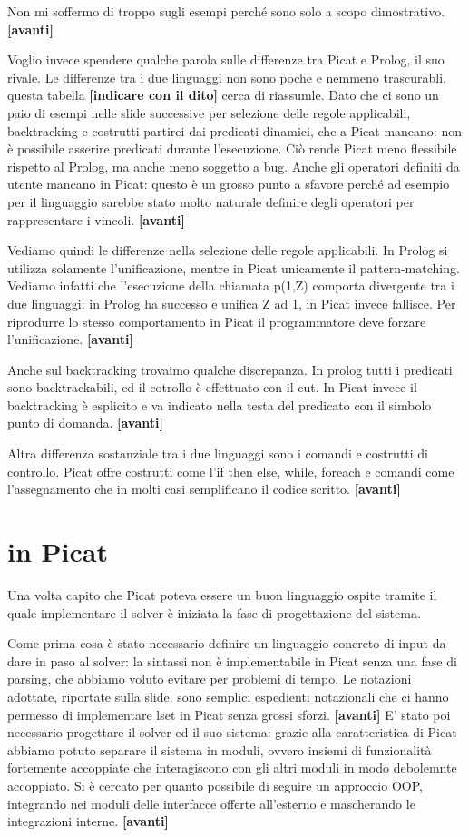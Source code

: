 \documentclass[11pt]{article}
\newcommand*{\nextslide}{\textbf{[avanti]}}
\newcommand*{\fingerpointer}{\textbf{[indicare con il dito]}}
\begin{document}
Non mi soffermo di troppo sugli esempi perché sono solo a scopo
dimostrativo. \nextslide{}

\medskip

Voglio invece spendere qualche parola sulle differenze tra Picat e
Prolog, il suo rivale. Le differenze tra i due linguaggi non sono
poche e nemmeno trascurabli. questa tabella \fingerpointer{} cerca di
riassumle. Dato che ci sono un paio di esempi nelle slide successive
per selezione delle regole applicabili, backtracking e costrutti
partirei dai predicati dinamici, che a Picat mancano: non è possibile
asserire predicati durante l'esecuzione. Ciò rende Picat meno
flessibile rispetto al Prolog, ma anche meno soggetto a bug. Anche gli
operatori definiti da utente mancano in Picat: questo è un grosso
punto a sfavore perché ad esempio per il linguaggio \lset{} sarebbe
stato molto naturale definire degli operatori per rappresentare i
vincoli. \nextslide{}

Vediamo quindi le differenze nella selezione delle regole applicabili.
In Prolog si utilizza solamente l'unificazione, mentre in Picat
unicamente il pattern-matching. Vediamo infatti che l'esecuzione della
chiamata p(1,Z) comporta divergente tra i due linguaggi: in Prolog ha
successo e unifica Z ad 1, in Picat invece fallisce. Per riprodurre lo
stesso comportamento in Picat il programmatore deve forzare
l'unificazione.  \nextslide{}

Anche sul backtracking trovaimo qualche discrepanza. In prolog tutti i
predicati sono backtrackabili, ed il cotrollo è effettuato con il
cut. In Picat invece il backtracking è esplicito e va indicato nella
testa del predicato con il simbolo punto di domanda.  \nextslide{}

Altra differenza sostanziale tra i due linguaggi sono i comandi e
costrutti di controllo. Picat offre costrutti come l'if then else,
while, foreach e comandi come l'assegnamento che in molti casi
semplificano il codice scritto.  \nextslide{}

\section*{\lset{} in Picat}

Una volta capito che Picat poteva essere un buon linguaggio ospite
tramite il quale implementare il solver è iniziata la fase di
progettazione del sistema.

Come prima cosa è stato necessario definire un linguaggio concreto di
input da dare in paso al solver: la sintassi \lset{} non è
implementabile in Picat senza una fase di parsing, che abbiamo voluto
evitare per problemi di tempo. Le notazioni adottate, riportate sulla
slide. sono semplici espedienti notazionali che ci hanno permesso di
implementare lset in Picat senza grossi sforzi. \nextslide{} E' stato
poi necessario progettare il solver ed il suo sistema: grazie alla
caratteristica di Picat abbiamo potuto separare il sistema in moduli,
ovvero insiemi di funzionalità fortemente accoppiate che interagiscono
con gli altri moduli in modo debolemnte accoppiato. Si è cercato per
quanto possibile di seguire un approccio OOP, integrando nei moduli
delle interfacce offerte all'esterno e mascherando le integrazioni
interne.  \nextslide{}
\end{document}
